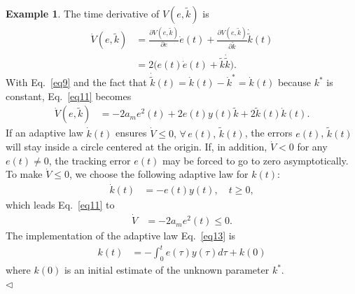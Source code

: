 \documentclass[11pt,a4paper,oneside]{book}
\numberwithin{equation}{section}
\theoremstyle{it}
\theoremstyle{definition}
\newtheorem{example}{Example}[chapter]
\begin{document}
\begin{example}
	The time derivative of  $V(e,\tilde{k})$ is
	\begin{equation}\label{eq11}
		\begin{aligned}
			\dot{V}(e,\tilde{k}) &= \frac{\partial {V}(e,\tilde{k})}{\partial e}\dot{e}(t)+\frac{\partial {V}(e,\tilde{k})}{\partial \tilde{k}}\dot{\tilde{k}}(t) \\[6pt]
			&= 2\Big(e(t)\dot{e}(t)+\tilde{k}\dot{\tilde{k}}\Big).
		\end{aligned}
	\end{equation} 
	With Eq.~\ref{eq9} and the fact that $\dot{\tilde{k}}(t)=\dot{k}(t)-\dot{k}^*=\dot{k}(t)$ because $k^*$ is constant, Eq.~\ref{eq11} becomes
	\begin{equation}\label{eq12}
		\begin{aligned}
			\dot{V}(e,\tilde{k}) &= -2a_me^2(t)+2e(t)y(t)\tilde{k}+2\tilde{k}(t)\dot{k}(t).
		\end{aligned}
	\end{equation} 
	If an adaptive law $\dot{k}(t)$ ensures $\dot{V}\le0,\,\forall\,e(t),\,\tilde{k}(t)$, the errors $e(t)$, $\tilde{k}(t)$ will stay inside a circle centered at the origin. If, in addition, $\dot{V}<0$ for any $e(t)\ne0$, the tracking error $e(t)$ may be forced to go to zero asymptotically. To make $\dot{V}\le0$, we choose the following adaptive law for $k(t)$:
	\begin{equation}\label{eq13}
		\begin{aligned}
			\dot{k}(t) &= -e(t)y(t),\quad t\ge0,
		\end{aligned}
	\end{equation} 
	which leads Eq.~\ref{eq11} to 
	\begin{equation}\label{eq14}
		\begin{aligned}
			\dot{V} &= -2a_me^2(t)\le0.
		\end{aligned}
	\end{equation} 
	The implementation of the adaptive law Eq.~\ref{eq13} is
	\begin{equation}\label{eq15}
		\begin{aligned}
			k(t) &= -\int_{0}^{t}e(\tau)y(\tau)d\tau+k(0)
		\end{aligned}
	\end{equation} 
	where $k(0)$ is an initial estimate of the unknown parameter $k^*$.\\
	$\triangleleft$
\end{example}
\end{document}
